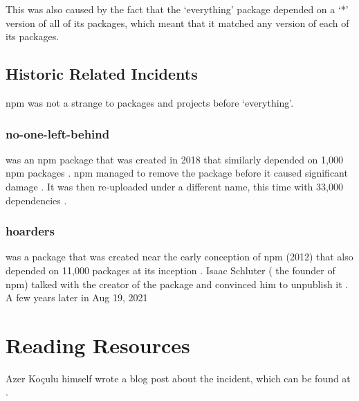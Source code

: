 \documentclass[acmsmall]{acmart}
\begin{document}
This was also caused by the fact that the `everything' package depended on a `*' version
of all of its packages, which meant that it matched any version of each of its packages.

\subsection{Historic Related Incidents}
npm was not a strange to packages and projects before `everything'.

\subsubsection{no-one-left-behind}
was an npm package that was created in 2018 that similarly depended
on 1,000 npm packages \cite{npm-no-one-left-behind-dependencies}. npm managed to remove
the package before it caused significant damage \cite{npm-no-one-left-behind-security}.
It was then re-uploaded under a different name, this time with 33,000 dependencies \cite{socket-everything}.

\subsubsection{hoarders}
was a package that was created near the early conception of npm (2012) that also depended
on 11,000 packages at its inception \cite{github-hoarders-dependencies}. Isaac Schluter (
the founder of npm) talked with the creator of the package and convinced him to unpublish it
\cite{github-hoarders}.  A few years later in Aug 19, 2021






\appendix
\section{Reading Resources}
Azer Koçulu himself wrote a blog post about the incident, which can be found at \cite{medium-azer}.
\end{document}
